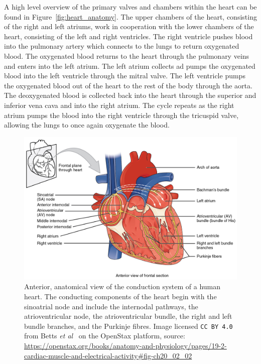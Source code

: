 \documentclass[\main/thesis.tex]{subfiles}
\begin{document}
A high level overview of the primary valves and chambers within the heart can be found in Figure~\ref{fig:heart_anatomy}.
The upper chambers of the heart, consisting of the right and left atriums, work in cooperation with the lower chambers of the heart, consisting of the left and right ventricles.
The right ventricle pushes blood into the pulmonary artery which connects to the lungs to return oxygenated blood.
The oxygenated blood returns to the heart through the pulmonary veins and enters into the left atrium.
The left atrium collects ad pumps the oxygenated blood into the left ventricle through the mitral valve.
The left ventricle pumps the oxygenated blood out of the heart to the rest of the body through the aorta.
The deoxygenated blood is collected back into the heart through the superior and inferior vena cava and into the right atrium.
The cycle repeats as the right atrium pumps the blood into the right ventricle through the tricuspid valve, allowing the lungs to once again oxygenate the blood.

\begin{figure}[ht]
    \centering
    \includegraphics[width=13cm]{figure/conduction-system-of-the-heart.jpeg}
    \caption[Anterior, anatomical view of the conduction system of a human heart.]{Anterior, anatomical view of the conduction system of a human heart. The conducting components of the heart begin with the sinoatrial node and include the internodal pathways, the atrioventricular node, the atrioventricular bundle, the right and left bundle branches, and the Purkinje fibres.
    Image licensed \texttt{CC BY 4.0} from Betts \emph{et al}~\cite{betts-anatomy-and-physiology} on the OpenStax platform, source: \url{https://openstax.org/books/anatomy-and-physiology/pages/19-2-cardiac-muscle-and-electrical-activity\#fig-ch20_02_02}}
    \label{fig:heart_conduction_system}
\end{figure}
\end{document}
